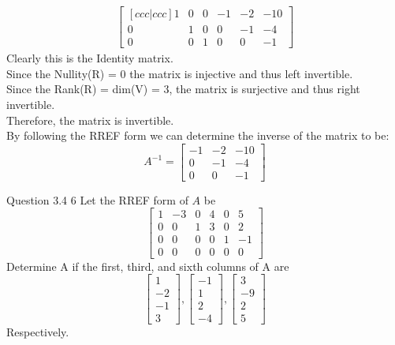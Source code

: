 \documentclass[answers,12pt,addpoints]{exam}
\begin{document}
\begin{questions}
\begin{solution}
\begin{align*}
\begin{bmatrix}[ccc|ccc]
                1 & 0 & 0 & -1 & -2 & -10\\
                0 & 1 & 0 & 0 & -1 & -4\\
                0 & 0 & 1 & 0 & 0 & -1
            \end{bmatrix}
        \end{align*}
        Clearly this is the Identity matrix.\\
        Since the Nullity(R) = 0 the matrix is injective and thus left invertible.\\
        Since the Rank(R) = dim(V) = 3, the matrix is surjective and thus right invertible.\\
        Therefore, the matrix is invertible.\\
        By following the RREF form we can determine the inverse of the matrix to be:
        $$ A^{-1} = \begin{bmatrix}
            -1 & -2 & -10\\
            0 & -1 & -4\\
            0 & 0 & -1
        \end{bmatrix}$$
    \end{solution}
    \question Question 3.4 6
    Let the RREF form of $A$ be 
    $$ \begin{bmatrix}
        1 & -3 & 0 & 4 & 0 & 5\\
        0 & 0 & 1 & 3 & 0 & 2\\
        0 & 0 & 0 & 0 & 1 & -1\\
        0 & 0 & 0 & 0 & 0 & 0
    \end{bmatrix}$$
    Determine A if the first, third, and sixth columns of A are
    $$ \begin{bmatrix}
        1\\
        -2\\
        -1\\
        3
    \end{bmatrix}, \begin{bmatrix}
        -1\\
        1\\
        2\\
        -4
    \end{bmatrix}, \begin{bmatrix}
        3\\
        -9\\
        2\\
        5
    \end{bmatrix}$$
    Respectively.
    \begin{solution}

\end{solution}
\end{questions}
\end{document}
